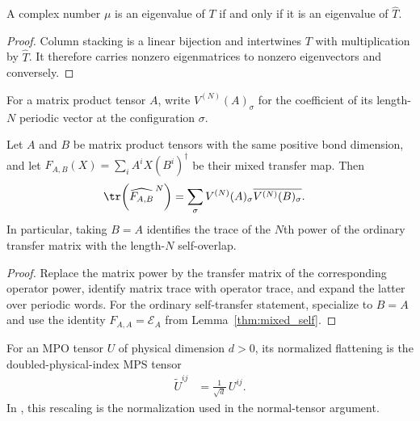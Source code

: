 \begin{lemma}
    \label{thm:mpu_transfer_matrix_eigenvalues}
    \leanok
    A complex number $\mu$ is an eigenvalue of $T$ if and only if it is an
    eigenvalue of $\widehat T$.
\end{lemma}

\begin{proof}\leanok

    Column stacking is a linear bijection and intertwines $T$ with
    multiplication by $\widehat T$.  It therefore carries nonzero
    eigenmatrices to nonzero eigenvectors and conversely.
\end{proof}

For a matrix product tensor $A$, write $V^{(N)}(A)_\sigma$ for the
coefficient of its length-$N$ periodic vector at the configuration $\sigma$.

\begin{lemma}
    \label{thm:mpu_transfer_matrix_overlap}
    \leanok
    Let $A$ and $B$ be matrix product tensors with the same positive bond
    dimension, and let $F_{A,B}(X)=\sum_i A^iX(B^i)^\dagger$ be their mixed
    transfer map.  Then
    \begin{align}
        \tr\!\left(\widehat{F_{A,B}}^{\,N}\right)
         & =\sum_\sigma V^{(N)}(A)_\sigma
        \overline{V^{(N)}(B)_\sigma}.
    \end{align}
    In particular, taking $B=A$ identifies the trace of the $N$th power of
    the ordinary transfer matrix with the length-$N$ self-overlap.
\end{lemma}

\begin{proof}\leanok
    Replace the matrix power by the transfer matrix of the corresponding
    operator power, identify matrix trace with operator trace, and expand the
    latter over periodic words.  For the ordinary self-transfer statement,
    specialize to $B=A$ and use the identity $F_{A,A}=\mathcal E_A$ from
    Lemma~\ref{thm:mixed_self}.
\end{proof}

\begin{definition}
    \label{def:mpu_normalized_flattening}
    \leanok
    For an MPO tensor $U$ of physical dimension $d>0$, its normalized
    flattening is the doubled-physical-index MPS tensor
    \begin{align}
        \widetilde U^{ij} & =\frac{1}{\sqrt d}\,U^{ij}.
    \end{align}
    In \cite[Section~III, equation~(13)]{Cirac2017MPU}, this rescaling is the normalization used in the normal-tensor
    argument.
\end{definition}

